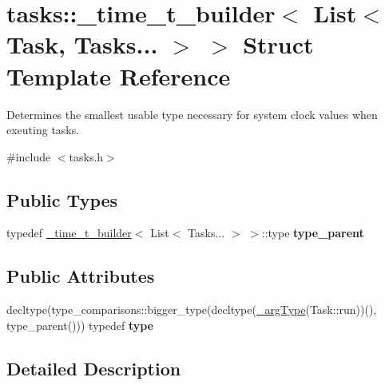 \hypertarget{structtasks_1_1__time__t__builder_3_01List_3_01Task_00_01Tasks_8_8_8_01_4_01_4}{}\section{tasks\+:\+:\+\_\+time\+\_\+t\+\_\+builder$<$ List$<$ Task, Tasks... $>$ $>$ Struct Template Reference}
\label{structtasks_1_1__time__t__builder_3_01List_3_01Task_00_01Tasks_8_8_8_01_4_01_4}


Determines the smallest usable type necessary for system clock values when exeuting tasks.  




{\ttfamily \#include $<$tasks.\+h$>$}

\subsection*{Public Types}
\begin{DoxyCompactItemize}
\item 
\hypertarget{structtasks_1_1__time__t__builder_3_01List_3_01Task_00_01Tasks_8_8_8_01_4_01_4_a4dffd6c85b0d44f416d2338f192b8e8c}{}\label{structtasks_1_1__time__t__builder_3_01List_3_01Task_00_01Tasks_8_8_8_01_4_01_4_a4dffd6c85b0d44f416d2338f192b8e8c} 
typedef \hyperlink{structtasks_1_1__time__t__builder}{\+\_\+time\+\_\+t\+\_\+builder}$<$ List$<$ Tasks... $>$ $>$\+::type {\bfseries type\+\_\+parent}
\end{DoxyCompactItemize}
\subsection*{Public Attributes}
\begin{DoxyCompactItemize}
\item 
\hypertarget{structtasks_1_1__time__t__builder_3_01List_3_01Task_00_01Tasks_8_8_8_01_4_01_4_a9ee8ecfc686a82fa8ad9bee39364bb2a}{}\label{structtasks_1_1__time__t__builder_3_01List_3_01Task_00_01Tasks_8_8_8_01_4_01_4_a9ee8ecfc686a82fa8ad9bee39364bb2a} 
decltype(type\+\_\+comparisons\+::bigger\+\_\+type(decltype(\hyperlink{namespacetasks_ac4a797a86584958bef0b67616a38c8ae}{\+\_\+arg\+Type}(Task\+::run))(), type\+\_\+parent())) typedef {\bfseries type}
\end{DoxyCompactItemize}


\subsection{Detailed Description}
